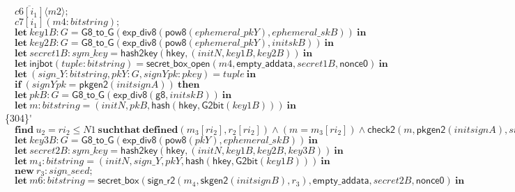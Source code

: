 \documentclass{article}
\newcommand{\cinput}[2]{{#1}({#2})}
\newcommand{\coutput}[2]{\overline{#1}\langle{#2}\rangle}
\newcommand{\kw}[1]{\mathbf{#1}}
\newcommand{\kwf}[1]{\mathsf{#1}}
\newcommand{\var}[1]{\mathit{#1}}
\newcommand{\kwt}[1]{\mathit{#1}}
\newcommand{\kwp}[1]{\mathit{#1}}
\newcommand{\kwc}[1]{\mathit{#1}}
\begin{document}
\begin{tabbing}
\>$\quad \coutput{\kwc{c6}[\var{i}_{1}]}{\var{m2}};$\\
\>$\quad \cinput{\kwc{c7}[\var{i}_{1}]}{\var{m4}: \kwt{bitstring}};$\\
\>$\quad \kw{let}\ \var{key1B}: \kwt{G} = \kwf{G8{\_}to{\_}G}(\kwf{exp{\_}div8}(\kwf{pow8}(\var{ephemeral{\_}pkY}), \var{ephemeral{\_}skB}))\ \kw{in}$\\
\>$\quad \kw{let}\ \var{key2B}: \kwt{G} = \kwf{G8{\_}to{\_}G}(\kwf{exp{\_}div8}(\kwf{pow8}(\var{ephemeral{\_}pkY}), \var{initskB}))\ \kw{in}$\\
\>$\quad \kw{let}\ \var{secret1B}: \kwt{sym{\_}key} = \kwf{hash2key}(\kwf{hkey}, \kwf{}(\var{initN}, \var{key1B}, \var{key2B}))\ \kw{in}$\\
\>$\quad \kw{let}\ \kwf{injbot}(\var{tuple}: \kwt{bitstring}) = \kwf{secret{\_}box{\_}open}(\var{m4}, \kwf{empty{\_}addata}, \var{secret1B}, \kwf{nonce0})\ \kw{in}$\\
\>$\quad \kw{let}\ \kwf{}(\var{sign{\_}Y}: \kwt{bitstring}, \var{pkY}: \kwt{G}, \var{signYpk}: \kwt{pkey}) = \var{tuple}\ \kw{in}$\\
\>$\quad \kw{if}\ (\var{signYpk}  =  \kwf{pkgen2}(\var{initsignA}))\ \kw{then}$\\
\>$\quad \kw{let}\ \var{pkB}: \kwt{G} = \kwf{G8{\_}to{\_}G}(\kwf{exp{\_}div8}(\kwf{g8}, \var{initskB}))\ \kw{in}$\\
\>$\quad \kw{let}\ \var{m}: \kwt{bitstring} = \kwf{}(\var{initN}, \var{pkB}, \kwf{hash}(\kwf{hkey}, \kwf{G2bit}(\var{key1B})))\ \kw{in}$\\
\>\{304\}\'$\quad \kw{find}\ \var{u}_{2} = \var{ri}_{2} \leq \kwp{N1}\ \kw{suchthat}\ \kw{defined}(\var{m}_{3}[\var{ri}_{2}], \var{r}_{2}[\var{ri}_{2}])\wedge (\var{m}  =  \var{m}_{3}[\var{ri}_{2}]) \wedge  \kwf{check2}(\var{m}, \kwf{pkgen2}(\var{initsignA}), \var{sign{\_}Y})\ \kw{then}$\\
\>$\quad \kw{let}\ \var{key3B}: \kwt{G} = \kwf{G8{\_}to{\_}G}(\kwf{exp{\_}div8}(\kwf{pow8}(\var{pkY}), \var{ephemeral{\_}skB}))\ \kw{in}$\\
\>$\quad \kw{let}\ \var{secret2B}: \kwt{sym{\_}key} = \kwf{hash2key}(\kwf{hkey}, \kwf{}(\var{initN}, \var{key1B}, \var{key2B}, \var{key3B}))\ \kw{in}$\\
\>$\quad \kw{let}\ \var{m}_{4}: \kwt{bitstring} = \kwf{}(\var{initN}, \var{sign{\_}Y}, \var{pkY}, \kwf{hash}(\kwf{hkey}, \kwf{G2bit}(\var{key1B})))\ \kw{in}$\\
\>$\quad \kw{new}\ \var{r}_{3}: \kwt{sign{\_}seed};$\\
\>$\quad \kw{let}\ \var{m6}: \kwt{bitstring} = \kwf{secret{\_}box}(\kwf{sign{\_}r2}(\var{m}_{4}, \kwf{skgen2}(\var{initsignB}), \var{r}_{3}), \kwf{empty{\_}addata}, \var{secret2B}, \kwf{nonce0})\ \kw{in}$\\

\end{tabbing}
\end{document}
